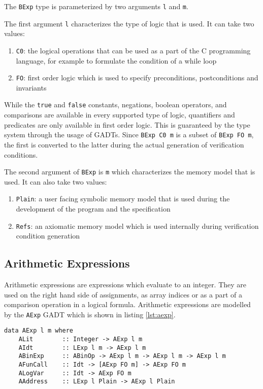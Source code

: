 \documentclass[12pt]{article}
\begin{document}
The \texttt{BExp} type is parameterized by two arguments \texttt{l} and \texttt{m}.

The first argument \texttt{l} characterizes the type of logic that is used.
It can take two values:
\begin{enumerate}
    \item \texttt{C0}: the logical operations that can be used as a part of the C programming language, for example to formulate the condition of a while loop
    \item \texttt{FO}: first order logic which is used to specify preconditions, postconditions and invariants
\end{enumerate}
 
While the \texttt{true} and \texttt{false} constants, negations, boolean operators, and comparisons are available in every supported type of logic, quantifiers and predicates are only available in first order logic.
This is guaranteed by the type system through the usage of GADTs.
Since \texttt{BExp C0 m} is a subset of \texttt{BExp FO m}, the first is converted to the latter during the actual generation of verification conditions.

The second argument of \texttt{BExp} is \texttt{m} which characterizes the memory model that is used.
It can also take two values:
\begin{enumerate}
    \item \texttt{Plain}: a user facing symbolic memory model that is used during the development of the program and the specification
    \item \texttt{Refs}: an axiomatic memory model which is used internally during verification condition generation
\end{enumerate}

\subsection{Arithmetic Expressions}

Arithmetic expressions are expressions which evaluate to an integer.
They are used on the right hand side of assignments, as array indices or as a part of a comparison operation in a logical formula.
Arithmetic expressions are modelled by the \texttt{AExp} GADT which is shown in listing \ref{lst:aexp}.

\begin{minipage}{\linewidth}
\begin{lstlisting}[style=c0, caption=AExp, label=lst:aexp]
data AExp l m where
    ALit        :: Integer -> AExp l m
    AIdt        :: LExp l m -> AExp l m
    ABinExp     :: ABinOp -> AExp l m -> AExp l m -> AExp l m
    AFunCall    :: Idt -> [AExp FO m] -> AExp FO m
    ALogVar     :: Idt -> AExp FO m
    AAddress    :: LExp l Plain -> AExp l Plain
\end{lstlisting}
\end{minipage}
\end{document}
